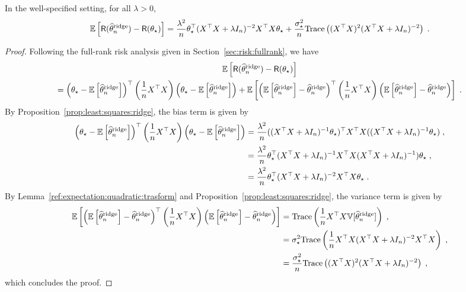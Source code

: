 \begin{proposition}
\label{prop:risk:ridge}
In the well-specified setting, for all $\lambda>0$,
$$
\mathbb{E}\left[\mathsf{R}(\widehat {\theta}^{\mathrm{ridge}}_n) - \mathsf{R}(\theta_\star)\right] = \frac{\lambda^2}{n}\theta_\star^\top(X^\top X + \lambda I_n)^{-2} X^\top X \theta_\star + \frac{\sigma_\star^{2}}{n}\mathrm{Trace}\left((X^\top X)^2(X^\top X + \lambda I_n)^{-2}\right)\;.
$$
\end{proposition}
\begin{proof}
Following the full-rank risk analysis given in Section~\ref{sec:risk:fullrank}, we have
\begin{multline*}
\mathbb{E}\left[\mathsf{R}(\widehat {\theta}^{\mathrm{ridge}}_n) - \mathsf{R}(\theta_\star)\right] \\
=\left(\theta_\star-\mathbb{E}\left[\widehat {\theta}^{\mathrm{ridge}}_n\right]\right)^\top \left(\frac{1}{n}X^\top X\right) \left(\theta_\star-\mathbb{E}\left[\widehat {\theta}^{\mathrm{ridge}}_n\right] \right) + \mathbb{E}\left[ \left(\mathbb{E}\left[\widehat {\theta}^{\mathrm{ridge}}_n\right] - \widehat {\theta}^{\mathrm{ridge}}_n\right)^\top \left(\frac{1}{n}X^\top X\right) \left(\mathbb{E}\left[\widehat {\theta}^{\mathrm{ridge}}_n\right] - \widehat {\theta}^{\mathrm{ridge}}_n\right)\right]\;.
\end{multline*}
By Proposition~\ref{prop:least:squares:ridge}, the bias term is given by
\begin{align*}
\left(\theta_\star-\mathbb{E}\left[\widehat {\theta}^{\mathrm{ridge}}_n\right]\right)^\top \left(\frac{1}{n}X^\top X\right) \left(\theta_\star-\mathbb{E}\left[\widehat {\theta}^{\mathrm{ridge}}_n\right] \right) &= \frac{\lambda^2}{n}((X^\top X + \lambda I_n)^{-1}\theta_\star)^\top X^\top X  ((X^\top X + \lambda I_n)^{-1}\theta_\star)\;,\\
&= \frac{\lambda^2}{n}\theta_\star^\top(X^\top X + \lambda I_n)^{-1} X^\top X  (X^\top X + \lambda I_n)^{-1})\theta_\star\;,\\
&= \frac{\lambda^2}{n}\theta_\star^\top(X^\top X + \lambda I_n)^{-2} X^\top X \theta_\star\;.
\end{align*}
By Lemma~\ref{ref:expectation:quadratic:trasform} and  Proposition~\ref{prop:least:squares:ridge}, the variance term is given by
\begin{align*}
\mathbb{E}\left[ \left(\mathbb{E}\left[\widehat {\theta}^{\mathrm{ridge}}_n\right] - \widehat {\theta}^{\mathrm{ridge}}_n\right)^\top \left(\frac{1}{n}X^\top X\right) \left(\mathbb{E}\left[\widehat {\theta}^{\mathrm{ridge}}_n\right] - \widehat {\theta}^{\mathrm{ridge}}_n\right)\right] &= \mathrm{Trace}\left(\frac{1}{n}X^\top X \mathbb{V}[\widehat {\theta}^{\mathrm{ridge}}_n]\right)\;,\\
&= \sigma_\star^{2}\mathrm{Trace}\left(\frac{1}{n}X^\top X(X^\top X + \lambda I_n)^{-2}X^\top X\right)\;,\\
&= \frac{\sigma_\star^{2}}{n}\mathrm{Trace}\left((X^\top X)^2(X^\top X + \lambda I_n)^{-2}\right)\;,
\end{align*}
which concludes the proof.
\end{proof}
